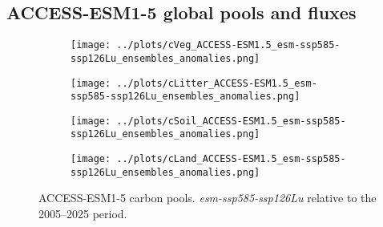 \documentclass[]{article}
\begin{document}
\subsection{ACCESS-ESM1-5 global pools and fluxes}

\begin{figure}[H]
    \centering
    \begin{subfigure}[b]{0.4\linewidth}
        \texttt{[image: ../plots/cVeg\_ACCESS-ESM1.5\_esm-ssp585-ssp126Lu\_ensembles\_anomalies.png]}
    \end{subfigure}
    \begin{subfigure}[b]{0.4\linewidth}
        \texttt{[image: ../plots/cLitter\_ACCESS-ESM1.5\_esm-ssp585-ssp126Lu\_ensembles\_anomalies.png]}
    \end{subfigure}
    \begin{subfigure}[b]{0.4\linewidth}
        \texttt{[image: ../plots/cSoil\_ACCESS-ESM1.5\_esm-ssp585-ssp126Lu\_ensembles\_anomalies.png]}
    \end{subfigure}
\begin{subfigure}[b]{0.4\linewidth}
        \texttt{[image: ../plots/cLand\_ACCESS-ESM1.5\_esm-ssp585-ssp126Lu\_ensembles\_anomalies.png]}
    \end{subfigure}
    \caption{ACCESS-ESM1-5 carbon pools. \textit{esm-ssp585-ssp126Lu} relative to the 2005--2025 period.}
    \label{fig:access_cpools}
\end{figure}
\end{document}
